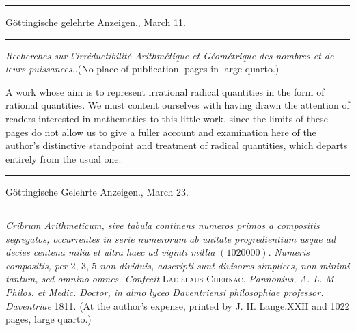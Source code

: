 \clearpage
{}
\thispagestyle{empty}
\begin{center}
\vspace*{1in}{\Large REVIEWS\par}
\vspace{.4in}{\large OF OTHER AUTHORS'\par}
\vspace{.4in}{\Large WRITINGS.\par}
\end{center}

\clearpage
{}
\renewcommand{\BookRunningTitle}{Reviews of Other Authors' Writings}
\begin{center}
\rule{.86\linewidth}{.3pt}\par
Göttingische gelehrte Anzeigen., March 11.\par
\rule{.86\linewidth}{.3pt}
\end{center}
\begin{center}
\emph{Recherches sur l'irréductibilité Arithmétique et Géométrique des nombres et de leurs puissances.}.\quad (No place of publication. pages in large quarto.)
\end{center}

A work whose aim is to represent irrational radical quantities in the form of rational quantities. We must content ourselves with having drawn the attention of readers interested in mathematics to this little work, since the limits of these pages do not allow us to give a fuller account and examination here of the author's distinctive standpoint and treatment of radical quantities, which departs entirely from the usual one.

\begin{center}
\rule{.86\linewidth}{.3pt}\par
Göttingische Gelehrte Anzeigen., March 23.\par
\rule{.86\linewidth}{.3pt}
\end{center}
\emph{Cribrum Arithmeticum, sive tabula continens numeros primos a compositis segregatos, occurrentes in serie numerorum ab unitate progredientium usque ad decies centena milia et ultra haec ad viginti millia} $(1020000)$. \emph{Numeris compositis, per} $2$, $3$, $5$ \emph{non dividuis, adscripti sunt divisores simplices, non minimi tantum, sed omnino}
\emph{omnes. Confecit} \textsc{Ladislaus Chernac}, \emph{Pannonius, A. L. M. Philos. et Medic. Doctor, in almo lyceo Daventriensi philosophiae professor. Daventriae} 1811. (At the author's expense, printed by J. H. Lange.\quad XXII and 1022 pages, large quarto.)

